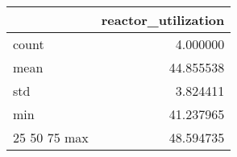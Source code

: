 \begin{tabular}{lr}
\toprule
 & reactor\_utilization \\
\midrule
count & 4.000000 \\
mean & 44.855538 \\
std & 3.824411 \\
min & 41.237965 \\
25%
50%
75%
max & 48.594735 \\
\bottomrule
\end{tabular}

